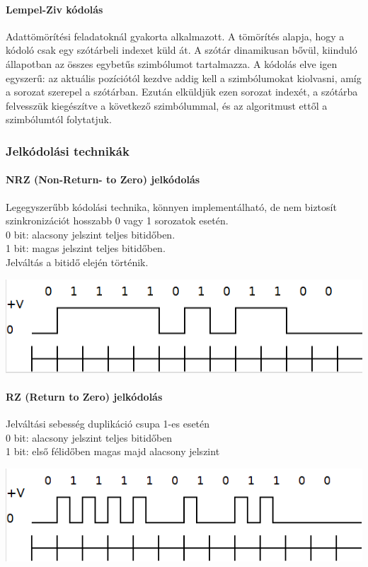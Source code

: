 \paragraph{Lempel-Ziv kódolás}
Adattömörítési feladatoknál gyakorta alkalmazott. A tömörítés alapja, hogy a kódoló csak egy szótárbeli indexet küld át. A szótár dinamikusan bővül, kiinduló állapotban az összes egybetűs szimbólumot tartalmazza. A kódolás elve igen egyszerű: az aktuális pozíciótól kezdve addig kell a szimbólumokat kiolvasni, amíg a sorozat szerepel a szótárban. Ezután elküldjük ezen sorozat indexét, a szótárba felvesszük kiegészítve a következő szimbólummal, és az algoritmust ettől a szimbólumtól folytatjuk.


\subsubsection{Jelkódolási technikák}
\begin{multicols}{2}
\paragraph{NRZ (Non-Return- to Zero) jelkódolás} Legegyszerűbb kódolási technika, könnyen implementálható, de nem biztosít szinkronizációt hosszabb 0 vagy 1 sorozatok esetén.\\
0 bit: alacsony jelszint teljes bitidőben.\\ 
1 bit: magas jelszint teljes bitidőben.\\ 
Jelváltás a bitidő elején történik.

\includegraphics[width=\linewidth]{fig/12-NRZ}
\end{multicols}

\begin{multicols}{2}
\paragraph{RZ (Return to Zero) jelkódolás} Jelváltási sebesség duplikáció csupa 1-es esetén\\
0 bit: alacsony jelszint teljes bitidőben\\
1 bit: első félidőben magas majd alacsony jelszint

\includegraphics[width=\linewidth]{fig/12-RZ}
\end{multicols}

